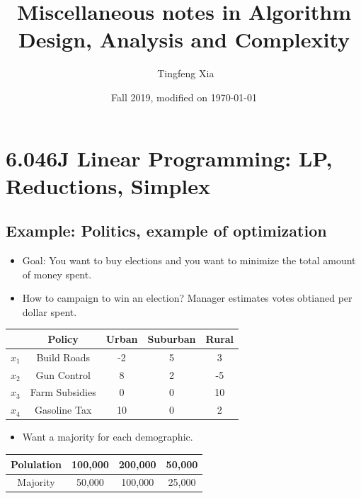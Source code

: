 \documentclass[10pt]{article}
\title{Miscellaneous notes in Algorithm Design, Analysis and Complexity}
\author{\ccLogo \,\,Tingfeng Xia}
\date{Fall 2019, modified on \today}
\begin{document}
\maketitle
\doclicenseThis
\tableofcontents
\newpage

\section{6.046J Linear Programming: LP, Reductions, Simplex}
\subsection{Example: Politics, example of optimization}
\begin{itemize}
    \item Goal: You want to buy elections and you want to minimize the total amount of money spent. 
    \item How to campaign to win an election? Manager estimates votes obtianed per dollar spent.
\end{itemize}
\begin{center}
    \begin{tabular}{|c|c||c|c|c|}
        \hline
         & Policy & Urban & Suburban & Rural \\
        \hline
        \hline
        $x_1$ & Build Roads & -2 & 5 & 3 \\
        \hline
        $x_2$ & Gun Control & 8 & 2 & -5 \\
        \hline
        $x_3$ & Farm Subsidies & 0 & 0 & 10 \\
        \hline
        $x_4$ & Gasoline Tax & 10 & 0 & 2 \\
        \hline
    \end{tabular}
\end{center}
\begin{itemize}
    \item Want a majority for each demographic. 
\end{itemize}
\begin{center}
    \begin{tabular}{|c||c|c|c|}
        \hline
        Polulation & 100,000 & 200,000 & 50,000 \\
        \hline
        Majority & 50,000 & 100,000 & 25,000 \\
        \hline
    \end{tabular}
\end{center}
\end{document}
